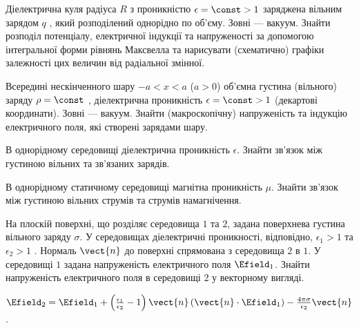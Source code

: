 \begin{problem}%
Діелектрична куля радіуса $R$  з проникністю  $\epsilon =\const > 1$ заряджена вільним зарядом $q$ , який розподілений однорідно по об’єму. Зовні ---
вакуум. Знайти розподіл потенціалу, електричної індукції та напруженості за допомогою інтегральної форми рівнянь Максвелла та нарисувати (схематично)
графіки залежності цих величин від радіальної змінної.
\end{problem}


\begin{problem}%
Всередині нескінченного шару  $-a < x < a$  ($a> 0 $) об’ємна густина (вільного) заряду $\rho = \const$ , діелектрична проникність $\epsilon =\const >
1$   (декартові координати). Зовні --- вакуум. Знайти (макроскопічну) напруженість та індукцію електричного поля, які створені зарядами шару.
\end{problem}


\begin{problem}%
В однорідному середовищі діелектрична проникність  $\epsilon$. Знайти зв’язок між густиною вільних та зв’язаних зарядів.
\end{problem}

\begin{problem}%
В однорідному статичному середовищі магнітна проникність $\mu$. Знайти зв’язок між густиною вільних струмів та струмів намагнічення.
\end{problem}



\begin{problem}
    На плоскій поверхні, що розділяє середовища $1$ та $2$, задана поверхнева густина вільного заряду $\sigma$. У середовищах діелектричні проникності, відповідно, $\epsilon_1 > 1$ та $\epsilon_2 > 1$ . Нормаль $\vect{n}$ до поверхні спрямована з середовища $2$ в $1$. У середовищі $1$ задана напруженість електричного поля $\Efield_1$. Знайти напруженість електричного поля в середовищі $2$ у векторному вигляді.
\begin{solution}
    $\Efield_2 = \Efield_1 + \left( \frac{\epsilon_1}{\epsilon _2} - 1 \right)\vect{n}\left( \vect{n} \cdot \Efield_1 \right) - \frac{4\pi \sigma }{\epsilon _2}{\vect{n}}$.
\end{solution}
\end{problem}


